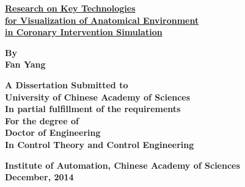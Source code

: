 
{\renewcommand{\baselinestretch}{1.0}

\thispagestyle{empty} %

\vspace*{0.5cm} %
\begin{center}
  {\xiaoerhao \hei \textsf{\textbf{\underline{Research on Key Technologies}\\
  \underline{for Visualization of Anatomical Environment}\\
  \underline{in Coronary Intervention Simulation}
  }}}
\end{center}

\vspace*{3.5cm} %
\begin{center}

\textsf{\sanhao \textrm{\textbf{By}}}\\
\textsf{\sanhao \textrm{\textbf{Fan Yang}}}

\vspace*{2.0cm} %
\xiaosihao \textrm{\textbf{ A Dissertation Submitted to\\
University of Chinese Academy of Sciences\\
In partial fulfillment of the requirements\\
For the degree of\\
Doctor of Engineering\\
In Control Theory and Control Engineering}}
\end{center}

\begin{center}
\vspace{1.5cm}
\xiaosihao \textrm{\textbf{Institute of Automation, Chinese Academy of Sciences}}\\
\wuhao \textrm{\textbf{December, 2014}}
\end{center}
} 